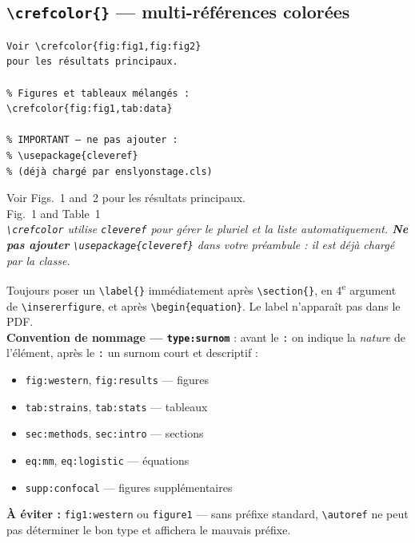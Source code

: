 \documentclass[12pt, a4paper]{article}
\newcommand{\simlink}[1]{\textcolor{ENSorange}{#1}}
\begin{document}
\subsection[\texttt{\textbackslash crefcolor} — multi-références]{\texttt{\textbackslash crefcolor\{\}} — multi-références colorées}

\begin{demo}
\begin{lstlisting}[style=latexcode]
% Plusieurs figures d'un coup :
Voir \crefcolor{fig:fig1,fig:fig2}
pour les résultats principaux.

% Figures et tableaux mélangés :
\crefcolor{fig:fig1,tab:data}

% IMPORTANT — ne pas ajouter :
% \usepackage{cleveref}
% (déjà chargé par enslyonstage.cls)
\end{lstlisting}
\tcblower
Voir \simlink{Figs.~1 and~2} pour les résultats principaux.\\[6pt]
\simlink{Fig.~1 and Table~1}\\[8pt]
{\footnotesize\itshape \texttt{\textbackslash crefcolor} utilise \texttt{cleveref} pour gérer le pluriel et la liste automatiquement. \textbf{Ne pas ajouter} \texttt{\textbackslash usepackage\{cleveref\}} dans votre préambule : il est déjà chargé par la classe.}
\end{demo}

\begin{astuce}
  Toujours poser un \verb|\label{}| immédiatement après \verb|\section{}|,
  en 4\textsuperscript{e} argument de \verb|\insererfigure|, et après
  \verb|\begin{equation}|. Le label n'apparaît pas dans le PDF.\\[6pt]
  \textbf{Convention de nommage — \texttt{type:surnom}} : avant le
  \texttt{:} on indique la \emph{nature} de l'élément, après le \texttt{:}
  un surnom court et descriptif :
  \begin{itemize}[noitemsep, topsep=3pt]
    \item \texttt{fig:western}, \texttt{fig:results} — figures
    \item \texttt{tab:strains}, \texttt{tab:stats} — tableaux
    \item \texttt{sec:methods}, \texttt{sec:intro} — sections
    \item \texttt{eq:mm}, \texttt{eq:logistic} — équations
    \item \texttt{supp:confocal} — figures supplémentaires
  \end{itemize}
  \textbf{À éviter :} \texttt{fig1:western} ou \texttt{figure1} — sans
  préfixe standard, \texttt{\textbackslash autoref} ne peut pas
  déterminer le bon type et affichera le mauvais préfixe.
\end{astuce}
\end{document}
